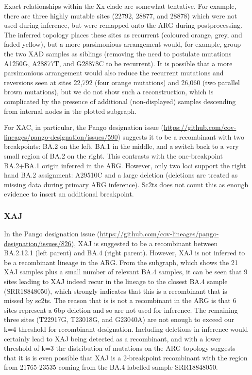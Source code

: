 \documentclass[12pt]{article}
\begin{document}
Exact relationships within the Xx clade are somewhat tentative.
For example, there are three highly mutable sites (22792, 28877, and 28878)
which were not used during inference,
but were remapped onto the ARG during postprocessing.
The inferred topology places these sites
as recurrent (coloured orange, grey, and faded yellow),
but a more parsimonious arrangement would,
for example, group the two XAD samples as siblings
(removing the need to postulate mutations
A1250G, A28877T, and G28878C to be recurrent).
It is possible that a more parsimonious arrangement would also
reduce the recurrent mutations and reversions seen at
sites 22,792 (four orange mutations) and
26,060 (two parallel brown mutations),
but we do not show such a reconstruction,
which is complicated by the presence of
additional (non-displayed) samples descending from
internal nodes in the plotted subgraph.

For XAC, in particular, the Pango designation issue
(\url{https://github.com/cov-lineages/pango-designation/issues/590}) suggests
it to be a recombinant with two breakpoints:
BA.2 on the left, BA.1 in the middle, and
a switch back to a very small region of BA.2 on the right.
This contrasts with the one-breakpoint BA.2+BA.1 origin inferred in the ARG.
However, only two loci support the right hand BA.2 assignment:
A29510C and a large deletion
(deletions are treated as missing data during primary ARG inference).
Sc2ts does not count this as enough evidence
to insert an additional breakpoint.


\subsubsection{XAJ}
\label{sec:dd_xaj}

In the Pango designation issue
(\url{https://github.com/cov-lineages/pango-designation/issues/826}),
XAJ is suggested to be a recombinant between
BA.2.12.1 (left parent) and BA.4 (right parent).
However, XAJ is not inferred to be a recombinant lineage in the ARG.
From the subgraph, which shows the 21 XAJ samples
plus a small number of relevant BA.4 samples,
it can be seen that 9 sites leading to XAJ indeed recur
in the lineage to the closest BA.4 sample (SRR18848050),
which strongly indicates that this is a recombinant
that is missed by sc2ts.
The reason that is is not a recombinant in the ARG is
that 6 sites represent a 6bp deletion and so are not used for inference.
The remaining three sites (T22917G, T23018G, and G23040A)
are not enough to exceed our k=4 threshold  for recombinant designation.
Including deletions in inference would certainly
lead to XAJ being detected as a recombinant,
and with a lower threshold of k=3
the distribution of mutations on the ARG topology suggests
that it is is even possible that XAJ is a 2-breakpoint recombinant
with the region from 21765-23535
coming from the BA.4 labelled sample SRR18848050.
\end{document}
